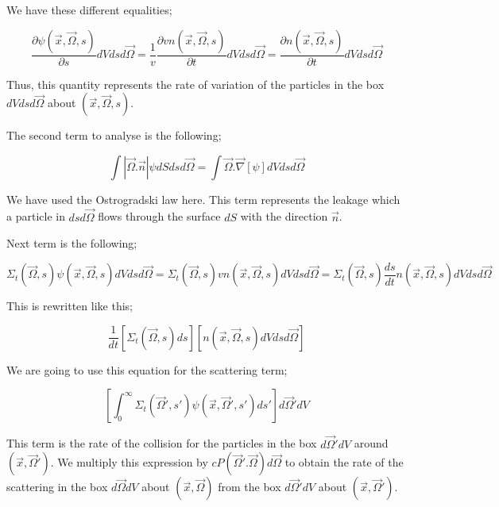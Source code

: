 \documentclass[a4paper, 12pt]{report}
\begin{document}
We have these different equalities;
 
\begin{equation}
 \frac{\partial \psi (\vec{x},\vec{\Omega},s)}{\partial s} dVdsd\vec{\Omega} = \frac{1}{v}  \frac{\partial v n (\vec{x},\vec{\Omega},s)}{\partial t} dVdsd\vec{\Omega} = \frac{\partial n (\vec{x},\vec{\Omega},s)}{\partial t} dVdsd\vec{\Omega}
\end{equation}

Thus, this quantity represents the rate of variation of the particles in the box $dVdsd\vec{\Omega}$ about $(\vec{x},\vec{\Omega},s)$.

The second term to analyse is the following;

\begin{equation}
\int |\vec{\Omega}.\vec{n}| \psi dSdsd\vec{\Omega} = \int \vec{\Omega}.\vec{\nabla}[\psi] dVdsd\vec{\Omega}
\end{equation}

We have used the Ostrogradski law here. This term represents the leakage which a particle in $dsd\vec{\Omega}$ flows through the surface $dS$ with the direction $\vec{n}$.

Next term is the following;

\begin{equation}
\Sigma_t(\vec{\Omega},s)\psi(\vec{x},\vec{\Omega},s)dVdsd\vec{\Omega} =  \Sigma_t(\vec{\Omega},s)v n(\vec{x},\vec{\Omega},s)dVdsd\vec{\Omega} = \Sigma_t(\vec{\Omega},s)\frac{ds}{dt}n(\vec{x},\vec{\Omega},s)dVdsd\vec{\Omega}
\end{equation} 

This is rewritten like this;

\begin{equation}
\frac{1}{dt}[\Sigma_t(\vec{\Omega},s)ds][n(\vec{x},\vec{\Omega},s)dVdsd\vec{\Omega}]
\end{equation}

We are going to use this equation for the scattering term;

\begin{equation}
\left[ \int_0^\infty \Sigma_t(\vec{\Omega}',s')\psi(\vec{x},\vec{\Omega}',s')ds' \right]d\vec{\Omega}'dV
\end{equation}

This term is the rate of the collision for the particles in the box $d\vec{\Omega}' dV$ around $(\vec{x},\vec{\Omega}')$. We multiply this expression by $cP(\vec{\Omega}'.\vec{\Omega})d\vec{\Omega}$ to obtain the rate of the scattering in the box $d\vec{\Omega} dV$ about $(\vec{x},\vec{\Omega})$ from the box $d\vec{\Omega}' dV$ about $(\vec{x},\vec{\Omega}')$.
\end{document}
